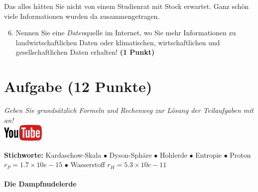\documentclass[a4paper, 9pt]{scrartcl}\usepackage[]{graphicx}\usepackage[]{xcolor}
\begin{document}
Das alles hätten Sie nicht von einem Studienrat mit Stock erwartet. Ganz schön viele Informationen wurden da zusammengetragen.

\begin{enumerate}
  \setcounter{enumi}{5}  
  \item Nennen Sie eine \textit{Daten}quelle im Internet, wo Sie mehr Informationen zu landwirtschaftlichen Daten oder klimatischen, wirtschaftlichen und gesellschaftlichen Daten erhalten! \textbf{(1 Punkt)}
\end{enumerate} 
\clearpage

\section{Aufgabe \hfill (12 Punkte)}

\textit{Geben Sie grunds{\"a}tzlich Formeln und Rechenweg zur L{\"o}sung der
  Teilaufgaben mit an!} \\[1Ex]

\hfill\href{https://youtu.be/WZSxntiNF8s}{\includegraphics[width = 2cm]{img/youtube}} %
\hspace{2Ex}

{\tiny\textbf{Stichworte:} Kardaschow-Skala $\bullet$ Dyson-Sphäre $\bullet$ Hohlerde $\bullet$ Entropie $\bullet$ Proton $r_P = 1.7 \times 10e-15$ $\bullet$ Wasserstoff $r_H = 5.3\times 10e-11$}

\paragraph{Die Dampfnudelerde}
\end{document}
